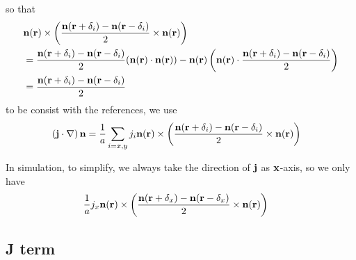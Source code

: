 \documentclass[aps,superscriptaddress,groupedaddress]{revtex4}  %
\begin{document}
so that
\begin{equation}
\begin{split}
&{\bf n}({\bf r})\times \left(\frac{{\bf n}({\bf r}+\delta _i)-{\bf n}({\bf r}-\delta _i)}{2}\times {\bf n}({\bf r})\right)\\
&=\frac{{\bf n}({\bf r}+\delta _i)-{\bf n}({\bf r}-\delta _i)}{2}({\bf n}({\bf r})\cdot {\bf n}({\bf r}))-{\bf n}({\bf r}) \left({\bf n}({\bf r})\cdot \frac{{\bf n}({\bf r}+\delta _i)-{\bf n}({\bf r}-\delta _i)}{2}\right)\\
&=\frac{{\bf n}({\bf r}+\delta _i)-{\bf n}({\bf r}-\delta _i)}{2}\\
\end{split}
\end{equation}
to be consist with the references, we use
\begin{equation}
\begin{split}
&\left({\bf j}\cdot \nabla\right) {\bf n}=\frac{1}{a}\sum _{i=x,y}j_i{\bf n}({\bf r})\times \left(\frac{{\bf n}({\bf r}+\delta _i)-{\bf n}({\bf r}-\delta _i)}{2}\times {\bf n}({\bf r})\right)
\end{split}
\end{equation}

In simulation, to simplify, we always take the direction of ${\bf j}$ as ${\bf x}$-axis, so we only have
\begin{equation}
\begin{split}
&\frac{1}{a}j_x{\bf n}({\bf r})\times \left(\frac{{\bf n}({\bf r}+\delta _x)-{\bf n}({\bf r}-\delta _x)}{2}\times {\bf n}({\bf r})\right)
\end{split}
\end{equation}

\subsection{\label{sec:2.2}J term}
\end{document}
